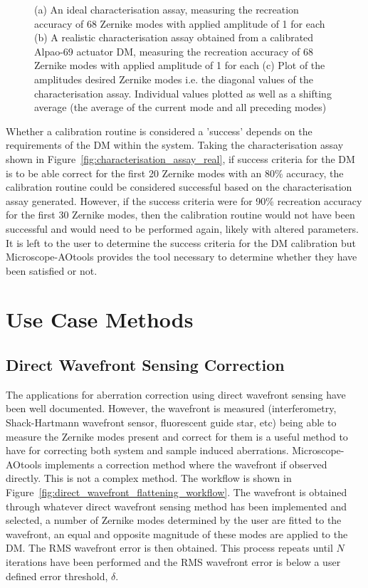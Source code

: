\begin{figure}[h]
\begin{subfigure}{0.4\textwidth}
		\caption{}
		\label{fig:characterisation_assay_ideal_diag_and_avg}
	\end{subfigure}
	\caption{(a) An ideal characterisation assay, measuring the recreation accuracy of 68 Zernike modes with applied amplitude of 1 for each (b) A realistic characterisation assay obtained from a calibrated Alpao-69 actuator DM, measuring the recreation accuracy of 68 Zernike modes with applied amplitude of 1 for each (c) Plot of the amplitudes desired Zernike modes i.e. the diagonal values of the characterisation assay. Individual values plotted as well as a shifting average (the average of the current mode and all preceding modes)}
	\label{fig:characterisation_assay_results}
\end{figure}

Whether a calibration routine is considered a 'success' depends on the requirements of the DM within the system. Taking the characterisation assay shown in Figure~\ref{fig:characterisation_assay_real}, if success criteria for the DM is to be able correct for the first 20 Zernike modes with an 80\% accuracy, the calibration routine could be considered successful based on the characterisation assay generated. However, if the success criteria were for 90\% recreation accuracy for the first 30 Zernike modes, then the calibration routine would not have been successful and would need to be performed again, likely with altered parameters. It is left to the user to determine the success criteria for the DM calibration but Microscope-AOtools provides the tool necessary to determine whether they have been satisfied or not.

\section{Use Case Methods}

\subsection{Direct Wavefront Sensing Correction}

The applications for aberration correction using direct wavefront sensing have been well documented. However, the wavefront is measured (interferometry, Shack-Hartmann wavefront sensor, fluorescent guide star, etc) being able to measure the Zernike modes present and correct for them is a useful method to have for correcting both system and sample induced aberrations. Microscope-AOtools implements a correction method where the wavefront if observed directly. This is not a complex method. The workflow is shown in Figure~\ref{fig:direct_wavefront_flattening_workflow}. The wavefront is obtained through whatever direct wavefront sensing method has been implemented and selected, a number of Zernike modes determined by the user are fitted to the wavefront, an equal and opposite magnitude of these modes are applied to the DM. The RMS wavefront error is then obtained. This process repeats until $N$ iterations have been performed and the RMS wavefront error is below a user defined error threshold, $\delta$.

